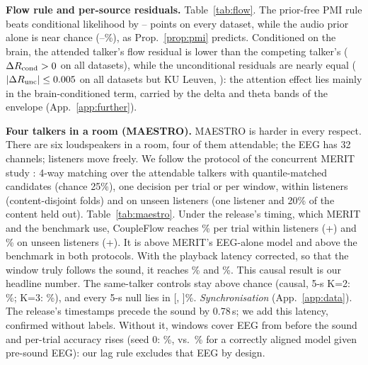 \documentclass[twoside]{article}
\begin{document}
\textbf{Flow rule and per-source residuals.} Table~\ref{tab:flow}. The prior-free PMI rule
beats conditional likelihood by \pmiGapMin--\pmiGapMax{} points on every dataset, while the audio prior alone
is near chance (\pmiPriorMin--\pmiPriorMax\%), as Prop.~\ref{prop:pmi} predicts. Conditioned on the brain, the attended
talker's flow residual is lower than the competing talker's
($\Delta R_{\rm cond}>0$ on all datasets), while the unconditional residuals are nearly equal
($|\Delta R_{\rm unc}|\le0.005$ on all datasets but KU Leuven, \dRuncKUL): the attention effect
lies mainly in the brain-conditioned term, carried by the delta and theta bands of the
envelope (App.~\ref{app:further}).

\begin{table}[!t]\centering\small
\caption{Flow-head decision rules at 5\,s (\%): prior-free PMI, conditional likelihood
only, audio prior only, and the PMI rule's EEG-shuffle null.
$\Delta R=R(\text{comp.})-R(\text{att.})$ for the conditional ($R_{\rm cond}$) and
unconditional ($R_{\rm unc}$) residuals; for SparrKULee and MEG-MASC the negative is the
mismatched window. Seed 0. NH/HI: normal-hearing/hearing-impaired listeners;
zh: Mandarin.}\label{tab:flow}
\resizebox{\columnwidth}{!}{}
\end{table}



\textbf{Four talkers in a room (MAESTRO).} MAESTRO \citep{maestro2026} is harder in
every respect. There are six loudspeakers in a room, four of them attendable; the EEG has
32 channels; listeners move freely. We follow the protocol of the concurrent MERIT
study \citep{merit2026}: 4-way
matching over the attendable talkers with quantile-matched candidates (chance 25\%), one
decision per trial or per window, within listeners (content-disjoint folds) and on unseen
listeners (one listener and 20\% of the content held out). Table~\ref{tab:maestro}. Under
the release's timing, which MERIT and the benchmark use, CoupleFlow reaches \maePWTrial\% per
trial within listeners (+\maePWCon) and \maePLTrial\% on unseen listeners (+\maePLCon). It is
above MERIT's EEG-alone model and above the benchmark in both protocols. With the playback
latency corrected, so that the window truly follows the sound, it reaches \maeWTrial\% and
\maeLTrial\%. This causal result is our headline number. The same-talker controls stay above chance (causal, 5-s K=2:
\maeWStTwo\%; K=3: \maeWStThree\%), and every 5-s null lies in [\maMainNullMin, \maMainNullMax]\%.
\emph{Synchronisation} (App.~\ref{app:data}). The release's timestamps precede the sound
by 0.78\,s; we add this latency, confirmed without labels. Without it, windows cover EEG
from before the sound and per-trial accuracy rises (seed 0: \maePkgTrial\%, vs.\ \maePreTrial\%
for a correctly aligned model given pre-sound EEG): our lag rule excludes that EEG by design.
\end{document}
